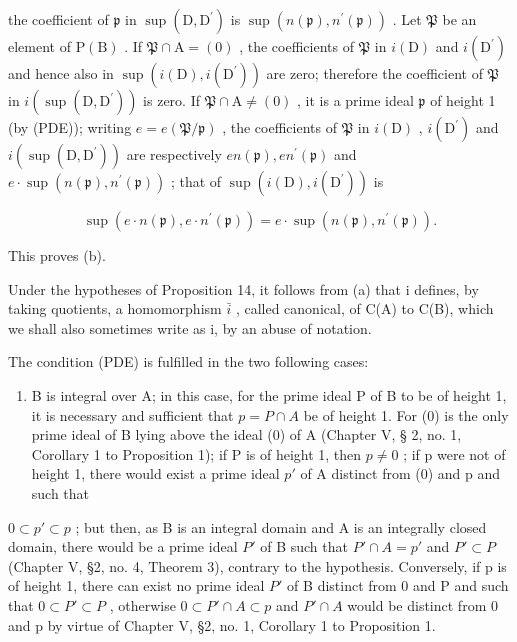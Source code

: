 the coefficient of \(\mathfrak{p}\) in \(\sup (\mathrm{D},\mathrm{D}^{\prime})\) is \(\sup (n(\mathfrak{p}),n^{\prime}(\mathfrak{p}))\) . Let \(\mathfrak{P}\) be an element of \(\mathrm{P(B)}\) . If \(\mathfrak{P}\cap \mathrm{A} = (0)\) , the coefficients of \(\mathfrak{P}\) in \(i(\mathrm{D})\) and \(i(\mathrm{D}^{\prime})\) and hence also in \(\sup (i(\mathrm{D}),i(\mathrm{D}^{\prime}))\) are zero; therefore the coefficient of \(\mathfrak{P}\) in \(i(\sup (\mathrm{D},\mathrm{D}^{\prime}))\) is zero. If \(\mathfrak{P}\cap \mathrm{A}\neq (0)\) , it is a prime ideal \(\mathfrak{p}\) of height 1 (by (PDE)); writing \(e = e(\mathfrak{P} / \mathfrak{p})\) , the coefficients of \(\mathfrak{P}\) in \(i(\mathrm{D})\) , \(i(\mathrm{D}^{\prime})\) and \(i(\sup (\mathrm{D},\mathrm{D}^{\prime}))\) are respectively \(en(\mathfrak{p}),en^{\prime}(\mathfrak{p})\) and \(e \cdot\sup (n(\mathfrak{p}),n^{\prime}(\mathfrak{p}))\) ; that of \(\sup (i(\mathrm{D}),i(\mathrm{D}^{\prime}))\) is

\[
\sup (e \cdot n (\mathfrak {p}), e \cdot n ^ {\prime} (\mathfrak {p})) = e \cdot \sup (n (\mathfrak {p}), n ^ {\prime} (\mathfrak {p})).
\]

This proves (b).

Under the hypotheses of Proposition 14, it follows from (a) that i defines, by taking quotients, a homomorphism \(\bar{i}\) , called canonical, of C(A) to C(B), which we shall also sometimes write as i, by an abuse of notation.

The condition (PDE) is fulfilled in the two following cases:

\begin{enumerate}
\def\labelenumi{(\arabic{enumi})}
\tightlist
\item
  B is integral over A; in this case, for the prime ideal P of B to be of height 1, it is necessary and sufficient that \(p = P \cap A\) be of height 1. For (0) is the only prime ideal of B lying above the ideal (0) of A (Chapter V, § 2, no. 1, Corollary 1 to Proposition 1); if P is of height 1, then \(p \neq 0\) ; if p were not of height 1, there would exist a prime ideal \(p'\) of A distinct from (0) and p and such that
\end{enumerate}

\(0 \subset p' \subset p\) ; but then, as B is an integral domain and A is an integrally closed domain, there would be a prime ideal \(P'\) of B such that \(P' \cap A = p'\) and \(P' \subset P\) (Chapter V, §2, no. 4, Theorem 3), contrary to the hypothesis. Conversely, if p is of height 1, there can exist no prime ideal \(P'\) of B distinct from 0 and P and such that \(0 \subset P' \subset P\) , otherwise \(0 \subset P' \cap A \subset p\) and \(P' \cap A\) would be distinct from 0 and p by virtue of Chapter V, §2, no. 1, Corollary 1 to Proposition 1.


